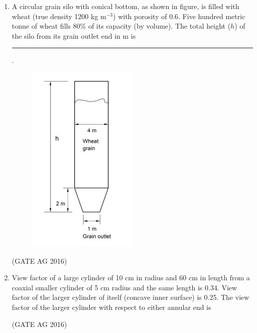 \documentclass[journal]{IEEEtran}
\begin{document}
\begin{enumerate}
\item
A circular grain silo with conical bottom, as shown in figure, is filled with wheat (true density 1200 kg m$^{-3}$) with porosity of 0.6. Five hundred metric tonne of wheat fills 80\% of its capacity (by volume). The total height ($h$) of the silo from its grain outlet end in m is \rule{3cm}{0.15mm}.
\begin{figure}[H]
    \centering
    \includegraphics[width=0.4\columnwidth]{Figs/fig1.png}
    \caption{}
    \label{fig 2}
\end{figure}
\hfill(GATE AG 2016)\\


\medskip

\item 
View factor of a large cylinder of 10 cm in radius and 60 cm in length from a coaxial smaller cylinder of 5 cm radius and the same length is 0.34. View factor of the larger cylinder of itself (concave inner surface) is 0.25. The view factor of the larger cylinder with respect to either annular end is
\begin{enumerate}
\end{enumerate}
\hfill(GATE AG 2016)\\


\medskip


\end{enumerate}
\end{document}
